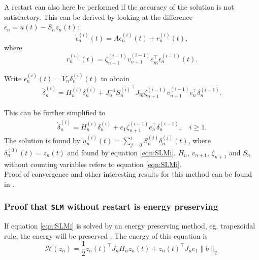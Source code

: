 \noindent A restart can also here be performed if the accuracy of the solution is not satisfactory. This can be derived by looking at the difference $ \epsilon_n = u(t) - S_n z_n(t)$: %
\begin{equation}
\dot{\epsilon}_n^{(i)}(t) = A \epsilon_n^{(i)}(t) + r_n^{(i)}(t),
\label{eqn:resenerg}
\end{equation}
where
\begin{equation*}
r_n^{(i)}(t) = \zeta_{n+1}^{(i-1)} v_{n+1}^{(i-1)} e_{\hat{m}}^\top \epsilon_n^{(i-1)}(t).
\end{equation*}

\noindent Write $ \epsilon^{(i)}_n(t)  = V_n \delta_n^{(i)}(t) $ to obtain
\begin{equation*}
\begin{aligned}
\dot{\delta}_n^{(i)} = H_n^{(i)} \delta_n^{(i)} + J^{-1}_n {S_n^{(i)}}^\top J_{\hat{m}} \zeta_{n+1}^{(i-1)}v_{n+1}^{(i-1)} e_n^\top \delta_n^{(i-1)}.
\end{aligned}
\end{equation*}

\noindent This can be further simplified to
\begin{equation}
\begin{aligned}
\dot{\delta}_n^{(i)} = H_n^{(i)} \delta_n^{(i)} + e_1 \zeta_{n+1}^{(i-1)} e_n^\top \delta_n^{(i-1)}, \quad i \geq 1.
\label{eqn:SLMr}
\end{aligned}
\end{equation}
\noindent The solution is found by $ u_n^{(i)}(t) = \sum \limits_{j = 0} ^i S_n^{(j)} \delta_n^{(j)} (t) $, where $\delta_n^{(0)} (t) = z_n(t)$ and found by equation \eqref{eqn:SLMi}. $H_n$, $v_{n+1}$, $\zeta_{n+1}$ and $S_n$ without counting variables refers to equation \eqref{eqn:SLMi}. \\

\noindent Proof of convergence and other interesting results for this method can be found in \cite{SLMinteresting}. 

\subsubsection{Proof that \texttt{SLM} without restart is energy preserving} %
If equation \eqref{eqn:SLMi} is solved by an energy preserving method, eg. trapezoidal rule, the energy will be preserved \cite{SLMpreserve}. The energy of this equation is
\begin{equation*}
\mathcal{H}(z_n) = \frac{1}{2}z_n(t)^\top J_n H_n z_n(t) + z_n(t)^\top J_n e_1 \|b \|_2
\end{equation*}

